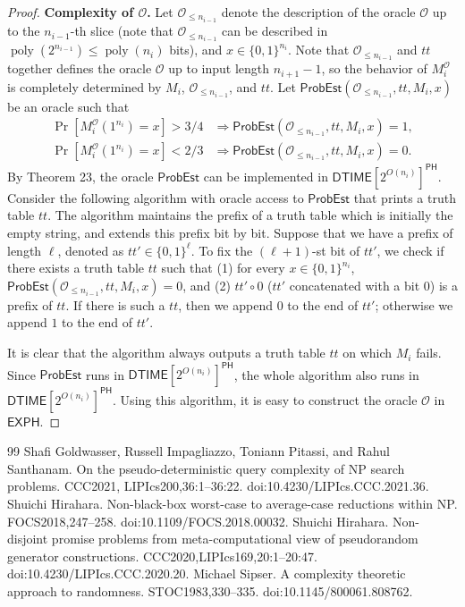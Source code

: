 \documentclass[10pt,a4paper]{article}
\begin{document}
\begin{proof}
\textbf{Complexity of $\mathcal O$.} Let $\mathcal O_{\leq n_{i-1}}$ denote the description of the oracle $\mathcal O$ up to the $n_{i-1}$-th slice (note that $\mathcal O_{\leq n_{i-1}}$ can be described in $\operatorname{poly}(2^{n_{i-1}})\leq\operatorname{poly}(n_i)$ bits), and $x\in\{0,1\}^{n_i}$. Note that $\mathcal O_{\leq n_{i-1}}$ and $tt$ together defines the oracle $\mathcal O$ up to input length $n_{i+1}-1$, so the behavior of $M_i^{\mathcal O}$ is completely determined by $M_i$, $\mathcal O_{\leq n_{i-1}}$, and $tt$. Let $\mathsf{ProbEst}(\mathcal O_{\leq n_{i-1}},tt,M_i,x)$ be an oracle such that
\begin{align*}
\Pr[M_i^{\mathcal O}(1^{n_i})=x]>3/4&\Longrightarrow\mathsf{ProbEst}(\mathcal O_{\leq n_{i-1}},tt,M_i,x)=1,\\
\Pr[M_i^{\mathcal O}(1^{n_i})=x]<2/3&\Longrightarrow\mathsf{ProbEst}(\mathcal O_{\leq n_{i-1}},tt,M_i,x)=0.
\end{align*}
By Theorem 23, the oracle $\mathsf{ProbEst}$ can be implemented in $\mathsf{DTIME}[2^{O(n_i)}]^{\mathsf{PH}}$. Consider the following algorithm with oracle access to $\mathsf{ProbEst}$ that prints a truth table $tt$. The algorithm maintains the prefix of a truth table which is initially the empty string, and extends this prefix bit by bit. Suppose that we have a prefix of length $\ell$, denoted as $tt'\in\{0,1\}^{\ell}$. To fix the $(\ell+1)$-st bit of $tt'$, we check if there exists a truth table $tt$ such that (1) for every $x\in\{0,1\}^{n_i}$, $\mathsf{ProbEst}(\mathcal O_{\leq n_{i-1}},tt,M_i,x)=0$, and (2) $tt'\circ0$ ($tt'$ concatenated with a bit $0$) is a prefix of $tt$. If there is such a $tt$, then we append $0$ to the end of $tt'$; otherwise we append $1$ to the end of $tt'$.

It is clear that the algorithm always outputs a truth table $tt$ on which $M_i$ fails. Since $\mathsf{ProbEst}$ runs in $\mathsf{DTIME}[2^{O(n_i)}]^{\mathsf{PH}}$, the whole algorithm also runs in $\mathsf{DTIME}[2^{O(n_i)}]^{\mathsf{PH}}$. Using this algorithm, it is easy to construct the oracle $\mathcal O$ in $\mathsf{EXPH}$.
\end{proof}

\begin{thebibliography}{99}
 Shafi Goldwasser, Russell Impagliazzo, Toniann Pitassi, and Rahul Santhanam. On the pseudo-deterministic query complexity of NP search problems. CCC2021, LIPIcs200,36:1--36:22. doi:10.4230/LIPIcs.CCC.2021.36.
 Shuichi Hirahara. Non-black-box worst-case to average-case reductions within NP. FOCS2018,247--258. doi:10.1109/FOCS.2018.00032.
 Shuichi Hirahara. Non-disjoint promise problems from meta-computational view of pseudorandom generator constructions. CCC2020,LIPIcs169,20:1--20:47. doi:10.4230/LIPIcs.CCC.2020.20.
 Michael Sipser. A complexity theoretic approach to randomness. STOC1983,330--335. doi:10.1145/800061.808762.
\end{thebibliography}
\end{document}
